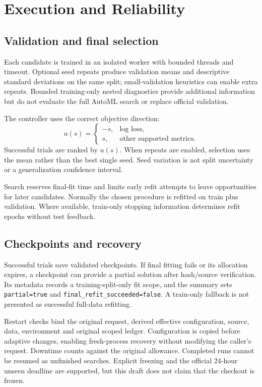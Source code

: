 \documentclass[11pt,a4paper]{article}
\newcommand{\code}[1]{\texttt{\small #1}}
\begin{document}
\section{Execution and Reliability}
\subsection{Validation and final selection}
Each candidate is trained in an isolated worker with bounded threads and timeout. Optional seed repeats produce validation means and descriptive standard deviations on the same split; small-validation heuristics can enable extra repeats. Bounded training-only nested diagnostics provide additional information but do not evaluate the full AutoML search or replace official validation.

The controller uses the correct objective direction:
\begin{equation}u(s)=\begin{cases}-s,&\text{log loss},\\s,&\text{other supported metrics}.\end{cases}\end{equation}
Successful trials are ranked by $u(s)$. When repeats are enabled, selection uses the mean rather than the best single seed. Seed variation is not split uncertainty or a generalization confidence interval.

Search reserves final-fit time and limits early refit attempts to leave opportunities for later candidates. Normally the chosen procedure is refitted on train plus validation. Where available, train-only stopping information determines refit epochs without test feedback.

\subsection{Checkpoints and recovery}
Successful trials save validated checkpoints. If final fitting fails or its allocation expires, a checkpoint can provide a partial solution after hash/source verification. Its metadata records a training-split-only fit scope, and the summary sets \code{partial=true} and \code{final\_refit\_succeeded=false}. A train-only fallback is not presented as successful full-data refitting.

Restart checks bind the original request, derived effective configuration, source, data, environment and original scoped ledger. Configuration is copied before adaptive changes, enabling fresh-process recovery without modifying the caller's request. Downtime counts against the original allowance. Completed runs cannot be resumed as unfinished searches. Explicit freezing and the official 24-hour unseen deadline are supported, but this draft does not claim that the checkout is frozen.
\end{document}
